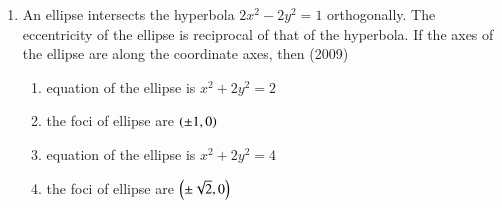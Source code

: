 \documentclass[journal,12pt,onecolumn]{IEEEtran}
\theoremstyle{remark}
\begin{document}
\begin{enumerate}
\item An ellipse intersects the hyperbola $2x^2-2y^2=1$ orthogonally. The eccentricity of the ellipse is reciprocal of that of the hyperbola. If the axes of the ellipse are along the coordinate axes, then \hfill(2009)\\
		\begin{enumerate}
			\item equation of the ellipse is $x^2+2y^2=2$
			\item the foci of ellipse are $\left(\pm1,0\right)$
			\item equation of the ellipse is $x^2+2y^2=4$
			\item the foci of ellipse are $\left(\pm\sqrt{2},0\right)$
		\end{enumerate}











\end{enumerate}
\end{document}

